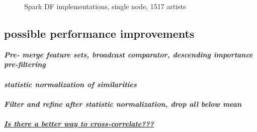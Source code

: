 \FloatBarrier
\begin{figure}[htbp]
	\centering
	\caption{Spark DF implementations, single node, 1517 artists}
	\label{fig:spark2}
\end{figure}
\FloatBarrier

\subsection{possible performance improvements}

\textit{\textbf{Pre- merge feature sets, broadcast comparator, descending importance pre-filtering\\}}
\\
\textit{\textbf{statistic normalization of similarities\\}}
\ \\
\textit{\textbf{Filter and refine after statistic normalization, drop all below mean\\}}
\ \\
\textit{\textbf{\underline{Is there a better way to cross-correlate???}\\}}
\ \\
